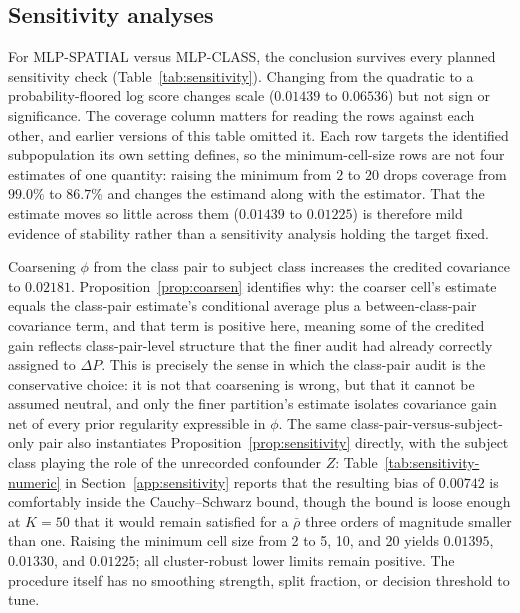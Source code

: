 \subsection{Sensitivity analyses}\label{sec:ablations}

For MLP-SPATIAL versus MLP-CLASS, the conclusion survives every planned sensitivity
check (Table~\ref{tab:sensitivity}). Changing from the quadratic to a probability-floored
log score changes scale ($0.01439$ to $0.06536$) but not sign or significance.
The coverage column matters for reading the rows against each other, and earlier
versions of this table omitted it. Each row targets the identified subpopulation its own
setting defines, so the minimum-cell-size rows are not four estimates of one quantity:
raising the minimum from $2$ to $20$ drops coverage from $99.0\%$ to $86.7\%$ and changes
the estimand along with the estimator. That the estimate moves so little across them
($0.01439$ to $0.01225$) is therefore mild evidence of stability rather than a
sensitivity analysis holding the target fixed.

Coarsening $\phi$ from the class pair to subject class increases the credited covariance
to $0.02181$. Proposition~\ref{prop:coarsen} identifies why: the coarser cell's estimate
equals the class-pair estimate's conditional average plus a between-class-pair covariance
term, and that term is positive here, meaning some of the credited gain reflects
class-pair-level structure that the finer audit had already correctly assigned to
$\Delta P$. This is precisely the sense in which the class-pair audit is the conservative
choice: it is not that coarsening is wrong, but that it cannot be assumed neutral, and
only the finer partition's estimate isolates covariance gain net of every prior regularity
expressible in $\phi$. The same class-pair-versus-subject-only pair also instantiates
Proposition~\ref{prop:sensitivity} directly, with the subject class playing the role of
the unrecorded confounder $Z$: Table~\ref{tab:sensitivity-numeric} in
Section~\ref{app:sensitivity} reports that the resulting bias of $0.00742$ is comfortably
inside the Cauchy--Schwarz bound, though the bound is loose enough at $K=50$ that it
would remain satisfied for a $\bar\rho$ three orders of magnitude smaller than one.
Raising the minimum cell size from 2 to 5, 10, and 20 yields
$0.01395$, $0.01330$, and $0.01225$; all cluster-robust lower limits remain positive.
The procedure itself has no smoothing strength, split fraction, or decision threshold
to tune.

